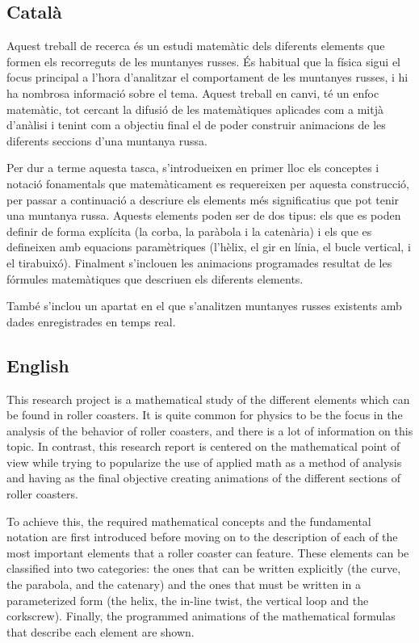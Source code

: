 \documentclass[12pt,twoside,a4paper]{article}
\begin{document}
	\subsection*{Català}
		Aquest treball de recerca és un estudi matemàtic dels diferents elements que formen els recorreguts de les muntanyes russes. És habitual que la física sigui el focus principal a l'hora d'analitzar el comportament de les muntanyes russes, i hi ha nombrosa informació sobre el tema. Aquest treball en canvi, té un enfoc matemàtic, tot cercant la difusió de les matemàtiques aplicades com a mitjà d'anàlisi i tenint com a objectiu final el de poder construir animacions de les diferents seccions d'una muntanya russa.
		
		Per dur a terme aquesta tasca, s’introdueixen en primer lloc els conceptes i notació fonamentals que matemàticament es requereixen per aquesta construcció, per passar a continuació a descriure els elements més significatius que pot tenir una muntanya russa. Aquests elements poden ser de dos tipus: els que es poden definir de forma explícita (la corba, la paràbola i la catenària) i els que es defineixen amb equacions paramètriques (l'hèlix, el gir en línia, el bucle vertical, i el tirabuixó). Finalment s’inclouen les animacions programades resultat de les fórmules matemàtiques que descriuen els diferents elements.
		
		També s'inclou un apartat en el que s'analitzen muntanyes russes existents amb dades enregistrades en temps real.
		
	\subsection*{English}
		This research project is a mathematical study of the different elements which can be found in roller coasters. It is quite common for physics to be the focus in the analysis of the behavior of roller coasters, and there is a lot of information on this topic. In contrast, this research report is centered on the mathematical point of view while trying to popularize the use of applied math as a method of analysis and having as the final objective creating animations of the different sections of roller coasters.
		
		To achieve this, the required mathematical concepts and the fundamental notation are first introduced before moving on to the description of each of the most important elements that a roller coaster can feature. These elements can be classified into two categories: the ones that can be written explicitly (the curve, the parabola, and the catenary) and the ones that must be written in a parameterized form (the helix, the in-line twist, the vertical loop and the corkscrew). Finally, the programmed animations of the mathematical formulas that describe each element are shown.
		
\end{document}
